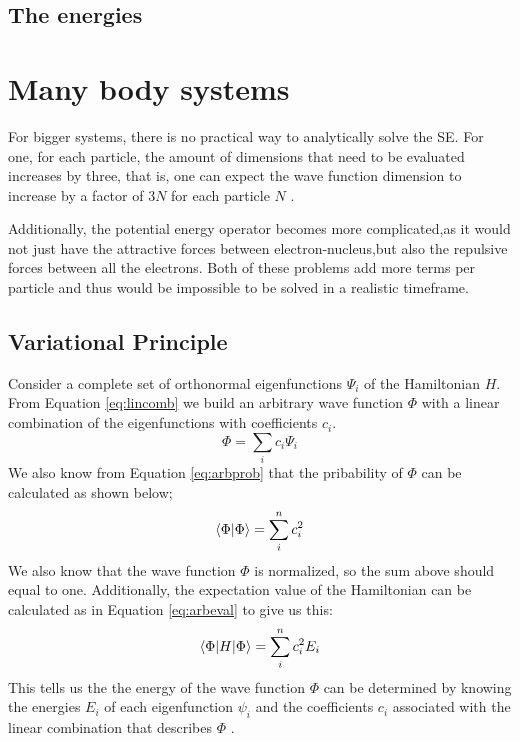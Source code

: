 \documentclass[../master_thesis.tex]{subfiles}
\begin{document}
\subsection{The energies}
\section{Many body systems}

For bigger systems, there is no practical way to analytically solve the
\ac{SE}. For one, for each particle, the amount of dimensions that need to be
evaluated increases by three, that is, one can expect the wave function
dimension to increase by a factor of $3N$ for each particle $N$
\cite{Cramer:2004}.

Additionally, the potential energy operator becomes more complicated,as it
would not just have the attractive forces between electron-nucleus,but also the
repulsive forces between all the electrons. Both of these problems add more
terms per particle and thus would be impossible to be solved in a realistic
timeframe. %

\subsection{Variational Principle}

Consider a complete set of orthonormal eigenfunctions $ \Psi_i$  of the
Hamiltonian $H$. From Equation \ref{eq:lincomb} we build an arbitrary
wave function $\Phi$ with a linear combination of the eigenfunctions with
coefficients $c_i$.
\begin{equation}
  \Phi = \sum\limits_ic_i\Psi_i
\end{equation}
We also know from Equation \ref{eq:arbprob} that the pribability of $\Phi$ can
be calculated as shown below;
\begin{equation}
  \braket{\Phi|\Phi} = \sum\limits_i^nc_i^2
\end{equation}
We also know that the wave function $\Phi$ is normalized, so the sum above
should equal to one. Additionally, the expectation value of the Hamiltonian can
be calculated as in Equation \ref{eq:arbeval} to give us this:
\begin{equation}
  \braket{\Phi|H|\Phi} = \sum\limits_i^nc_i^2E_i\label{eq:genenerg}
\end{equation}
This tells us the the energy of the wave function $\Phi$ can be determined by
knowing the energies $E_i$ of each eigenfunction $\psi_i$ and the coefficients
$c_i$ associated with the linear combination that describes $\Phi$
\cite{Cramer:2004}.
\end{document}
